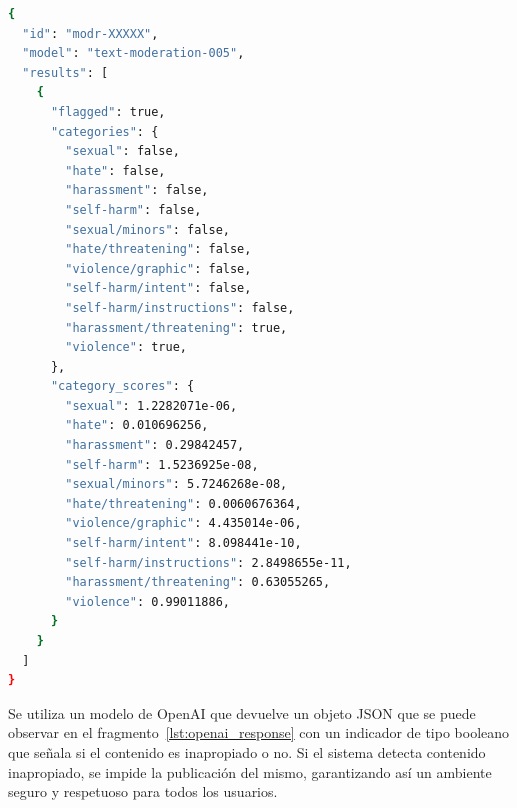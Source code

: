 \lstset{style=mystyle}
\begin{lstlisting}[language=Bash, caption={Respuesta JSON del modelo de moderación de OpenAI}, label=lst:openai_response, captionpos=b]
{
  "id": "modr-XXXXX",
  "model": "text-moderation-005",
  "results": [
    {
      "flagged": true,
      "categories": {
        "sexual": false,
        "hate": false,
        "harassment": false,
        "self-harm": false,
        "sexual/minors": false,
        "hate/threatening": false,
        "violence/graphic": false,
        "self-harm/intent": false,
        "self-harm/instructions": false,
        "harassment/threatening": true,
        "violence": true,
      },
      "category_scores": {
        "sexual": 1.2282071e-06,
        "hate": 0.010696256,
        "harassment": 0.29842457,
        "self-harm": 1.5236925e-08,
        "sexual/minors": 5.7246268e-08,
        "hate/threatening": 0.0060676364,
        "violence/graphic": 4.435014e-06,
        "self-harm/intent": 8.098441e-10,
        "self-harm/instructions": 2.8498655e-11,
        "harassment/threatening": 0.63055265,
        "violence": 0.99011886,
      }
    }
  ]
}
\end{lstlisting}


Se utiliza un modelo de OpenAI\cite{REF10}  que devuelve un objeto JSON que se puede observar en el fragmento~\ref{lst:openai_response} con un indicador de tipo booleano que señala si el contenido es inapropiado o no. Si el sistema detecta contenido inapropiado, se impide la publicación del mismo, garantizando así un ambiente seguro y respetuoso para todos los usuarios.






